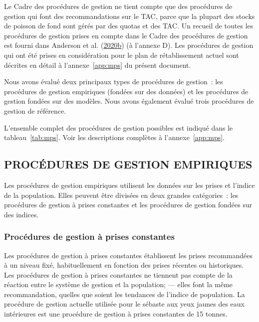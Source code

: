 \documentclass[11pt]{book}
\begin{document}
Le Cadre des procédures de gestion ne tient compte que des procédures de gestion qui font des recommandations sur le TAC, parce que la plupart des stocks de poisson de fond sont gérés par des quotas et des TAC. Un recueil de toutes les procédures de gestion prises en compte dans le Cadre des procédures de gestion est fourni dans Anderson et al. (\protect\hyperlink{ref-anderson2020gfmp}{2020}\protect\hyperlink{ref-anderson2020gfmp}{b}) (à l'annexe D). Les procédures de gestion qui ont été prises en considération pour le plan de rétablissement actuel sont décrites en détail à l'annexe~\ref{app:mps} du présent document.

Nous avons évalué deux principaux types de procédures de gestion~: les procédures de gestion empiriques (fondées sur des données) et les procédures de gestion fondées sur des modèles. Nous avons également évalué trois procédures de gestion de référence.

L'ensemble complet des procédures de gestion possibles est indiqué dans le tableau~\ref{tab:mps}. Voir les descriptions complètes à l'annexe~\ref{app:mps}.

\hypertarget{procuxe9dures-de-gestion-empiriques}{%
\subsection{PROCÉDURES DE GESTION EMPIRIQUES}\label{procuxe9dures-de-gestion-empiriques}}

Les procédures de gestion empiriques utilisent les données sur les prises et l'indice de la population. Elles peuvent être divisées en deux grandes catégories~: les procédures de gestion à prises constantes et les procédures de gestion fondées sur des indices.

\hypertarget{procuxe9dures-de-gestion-uxe0-prises-constantes}{%
\subsubsection{Procédures de gestion à prises constantes}\label{procuxe9dures-de-gestion-uxe0-prises-constantes}}

Les procédures de gestion à prises constantes établissent les prises recommandées à un niveau fixé, habituellement en fonction des prises récentes ou historiques. Les procédures de gestion à prises constantes ne tiennent pas compte de la réaction entre le système de gestion et la population; --- elles font la même recommandation, quelles que soient les tendances de l'indice de population. La procédure de gestion actuelle utilisée pour le sébaste aux yeux jaunes des eaux intérieures est une procédure de gestion à prises constantes de 15 tonnes.
\end{document}
